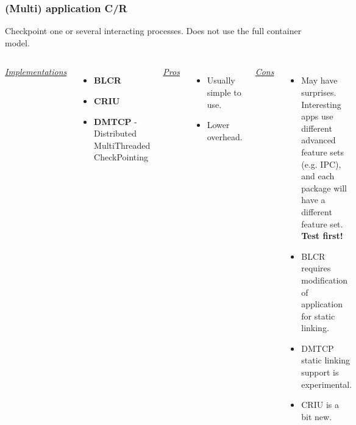 \documentclass[compress]{beamer}
\begin{document}
\begin{frame}
\frametitle{(Multi) application C/R}

Checkpoint one or several interacting processes. Does not use the full container model.

\begin{columns}[t]
\ul{\textit{Implementations}}
\begin{itemize}
\item \textbf{BLCR}
\item \textbf{CRIU}
\item \textbf{DMTCP} - Distributed MultiThreaded CheckPointing
\end{itemize}

\ul{\textit{Pros}}
\begin{itemize}
\item Usually simple to use.
\item Lower overhead.
\end{itemize}

\ul{\textit{Cons}}
\begin{itemize}
\item May have surprises. Interesting apps use different
advanced feature sets (e.g. IPC), and each package
will have a different feature set. \textbf{Test first!}
\item BLCR requires modification of application for static linking.
\item DMTCP static linking support is experimental.
\item CRIU is a bit new.
\end{itemize}

\end{columns}






\end{frame}
  
\end{document}

